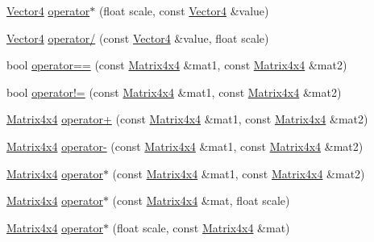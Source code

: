 \begin{DoxyCompactItemize}
\item 
\mbox{\hyperlink{struct_math_1_1_vector4}{Vector4}} \mbox{\hyperlink{namespace_math_a3dd17b1db67faf64ebabe1e113d40af4}{operator$\ast$}} (float scale, const \mbox{\hyperlink{struct_math_1_1_vector4}{Vector4}} \&value)
\item 
\mbox{\hyperlink{struct_math_1_1_vector4}{Vector4}} \mbox{\hyperlink{namespace_math_a22a570ffffa9a4508274b38d5f26da25}{operator/}} (const \mbox{\hyperlink{struct_math_1_1_vector4}{Vector4}} \&value, float scale)
\item 
bool \mbox{\hyperlink{namespace_math_a5b40764391fa4cbbc642c330f4299874}{operator==}} (const \mbox{\hyperlink{struct_math_1_1_matrix4x4}{Matrix4x4}} \&mat1, const \mbox{\hyperlink{struct_math_1_1_matrix4x4}{Matrix4x4}} \&mat2)
\item 
bool \mbox{\hyperlink{namespace_math_af3f64c58fbe9c4788f9697c9a12dfdf7}{operator!=}} (const \mbox{\hyperlink{struct_math_1_1_matrix4x4}{Matrix4x4}} \&mat1, const \mbox{\hyperlink{struct_math_1_1_matrix4x4}{Matrix4x4}} \&mat2)
\item 
\mbox{\hyperlink{struct_math_1_1_matrix4x4}{Matrix4x4}} \mbox{\hyperlink{namespace_math_a389dadeebac6c85cbab4622add8901a5}{operator+}} (const \mbox{\hyperlink{struct_math_1_1_matrix4x4}{Matrix4x4}} \&mat1, const \mbox{\hyperlink{struct_math_1_1_matrix4x4}{Matrix4x4}} \&mat2)
\item 
\mbox{\hyperlink{struct_math_1_1_matrix4x4}{Matrix4x4}} \mbox{\hyperlink{namespace_math_a63a0e723e7843e2eb47b2285846df34f}{operator-\/}} (const \mbox{\hyperlink{struct_math_1_1_matrix4x4}{Matrix4x4}} \&mat1, const \mbox{\hyperlink{struct_math_1_1_matrix4x4}{Matrix4x4}} \&mat2)
\item 
\mbox{\hyperlink{struct_math_1_1_matrix4x4}{Matrix4x4}} \mbox{\hyperlink{namespace_math_a06472d628f45d93a8bdb7cdcb0b1be8d}{operator$\ast$}} (const \mbox{\hyperlink{struct_math_1_1_matrix4x4}{Matrix4x4}} \&mat1, const \mbox{\hyperlink{struct_math_1_1_matrix4x4}{Matrix4x4}} \&mat2)
\item 
\mbox{\hyperlink{struct_math_1_1_matrix4x4}{Matrix4x4}} \mbox{\hyperlink{namespace_math_adddddb021bc36b35e73f09ed99fa11c5}{operator$\ast$}} (const \mbox{\hyperlink{struct_math_1_1_matrix4x4}{Matrix4x4}} \&mat, float scale)
\item 
\mbox{\hyperlink{struct_math_1_1_matrix4x4}{Matrix4x4}} \mbox{\hyperlink{namespace_math_a7239dba8d71c3d6209d9fd502fd1e2ad}{operator$\ast$}} (float scale, const \mbox{\hyperlink{struct_math_1_1_matrix4x4}{Matrix4x4}} \&mat)
\item 

\end{DoxyCompactItemize}

